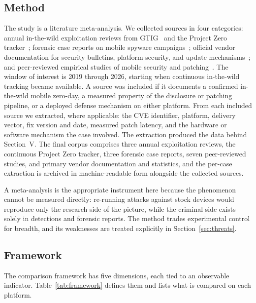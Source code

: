 \documentclass[conference,a4paper]{IEEEtran}
\begin{document}
\subsection{Method}
The study is a literature meta-analysis. We collected sources in four
categories: annual in-the-wild exploitation reviews from
GTIG~\cite{gtig2023review, charrier2025zeroday, gtig2026review} and the
Project Zero tracker~\cite{p0tracker}; forensic case reports on mobile
spyware campaigns~\cite{marczak2021forcedentry, amnesty2021forensic,
marczak2025graphite};
official vendor documentation for security bulletins, platform security,
and update mechanisms~\cite{aospbulletin2026, applesecurity2026}; and
peer-reviewed empirical studies of mobile security and
patching~\cite{bilge2012before, jones2020deploying, zhang2021kernel,
garg2021comparative}. The window of interest is 2019 through 2026,
starting when continuous in-the-wild tracking became available. A source
was included if it documents a confirmed in-the-wild mobile zero-day, a
measured property of the disclosure or patching pipeline, or a deployed
defense mechanism on either platform. From each included source we
extracted, where applicable: the CVE identifier, platform, delivery
vector, fix version and date, measured patch latency, and the hardware or
software mechanism the case involved. The extraction produced the data
behind Section~V. The final corpus comprises three annual exploitation
reviews, the continuous Project Zero tracker, three forensic case reports,
seven peer-reviewed studies, and primary vendor documentation and
statistics, and the per-case extraction is archived in machine-readable
form alongside the collected sources.

A meta-analysis is the appropriate instrument here because the phenomenon
cannot be measured directly: re-running attacks against stock devices
would reproduce only the research side of the picture, while the criminal
side exists solely in detections and forensic reports. The method trades
experimental control for breadth, and its weaknesses are treated
explicitly in Section~\ref{sec:threats}.

\subsection{Framework}
The comparison framework has five dimensions, each tied to an observable
indicator. Table~\ref{tab:framework} defines them and lists what is
compared on each platform.
\end{document}
